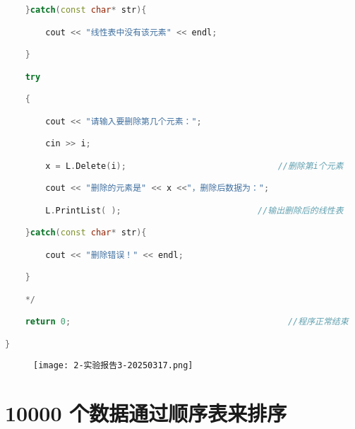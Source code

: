\begin{lstlisting}[language=C++]
    }catch(const char* str){

        cout << "线性表中没有该元素" << endl;

    }

    try

    {

        cout << "请输入要删除第几个元素：";

        cin >> i;

        x = L.Delete(i);                              //删除第i个元素

        cout << "删除的元素是" << x <<"，删除后数据为：";

        L.PrintList( );                           //输出删除后的线性表

    }catch(const char* str){

        cout << "删除错误！" << endl;

    }

    */

    return 0;                                           //程序正常结束

}
\end{lstlisting}
\begin{figure}[H]
\centering
\texttt{[image: 2-实验报告3-20250317.png]}
\label{}
\end{figure}

\section{10000 个数据通过顺序表来排序}

